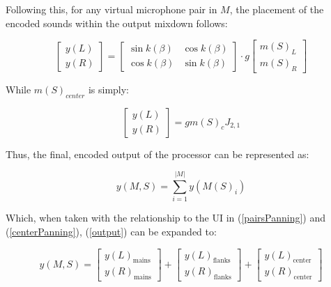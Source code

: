 Following this, for any virtual microphone pair in $M$, the placement of the encoded sounds within the output mixdown follows:

\begin{equation}\label{centerPanning}
\begin{bmatrix} y(L) \\ y(R) \end{bmatrix} = \begin{bmatrix} \sin{k(\beta)} & \cos{k(\beta)} \\ \cos{k(\beta)} & \sin{k(\beta)} \end{bmatrix} \cdot g\begin{bmatrix} m(S)_L \\ m(S)_R \end{bmatrix}
\end{equation}

While $m(S)_{center}$ is simply:

\begin{equation}
\begin{bmatrix} y(L) \\ y(R) \end{bmatrix} = gm(S)_{c}J_{2,1}
\end{equation}

Thus, the final, encoded output of the processor can be represented as:

\begin{equation}\label{output}
y(M, S) = \sum\limits_{i=1}^{|M|} y(M(S)_i)
\end{equation}

Which, when taken with the relationship to the UI in (\ref{pairsPanning}) and (\ref{centerPanning}), (\ref{output}) can be expanded to:

\begin{equation}
y(M, S) = \begin{bmatrix} y(L)_\text{mains} \\ y(R)_\text{mains} \end{bmatrix} + \begin{bmatrix} y(L)_\text{flanks} \\ y(R)_\text{flanks} \end{bmatrix} + \begin{bmatrix} y(L)_\text{center} \\ y(R)_\text{center} \end{bmatrix}
\end{equation}

